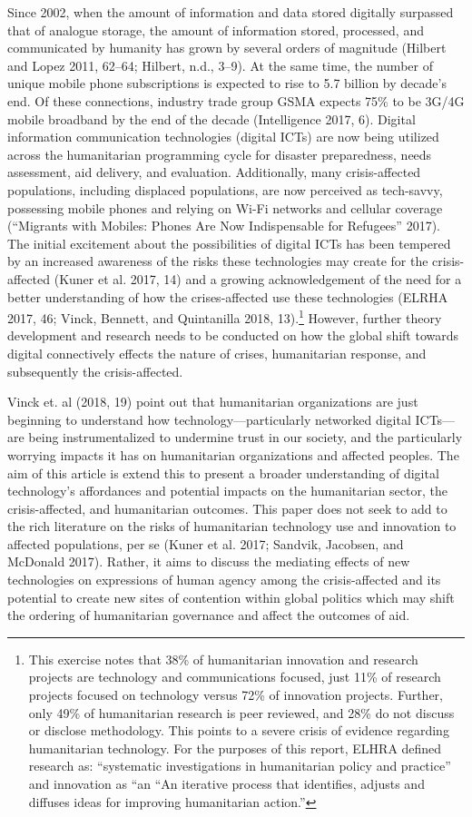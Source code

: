 \documentclass[
]{article}
\begin{document}
Since 2002, when the amount of information and data stored digitally
surpassed that of analogue storage, the amount of information stored,
processed, and communicated by humanity has grown by several orders of
magnitude (Hilbert and Lopez 2011, 62--64; Hilbert, n.d., 3--9). At the
same time, the number of unique mobile phone subscriptions is expected
to rise to 5.7 billion by decade's end. Of these connections, industry
trade group GSMA expects 75\% to be 3G/4G mobile broadband by the end of
the decade (Intelligence 2017, 6). Digital information communication
technologies (digital ICTs) are now being utilized across the
humanitarian programming cycle for disaster preparedness, needs
assessment, aid delivery, and evaluation. Additionally, many
crisis-affected populations, including displaced populations, are now
perceived as tech-savvy, possessing mobile phones and relying on Wi-Fi
networks and cellular coverage (``Migrants with Mobiles: Phones Are Now
Indispensable for Refugees'' 2017). The initial excitement about the
possibilities of digital ICTs has been tempered by an increased
awareness of the risks these technologies may create for the
crisis-affected (Kuner et al. 2017, 14) and a growing acknowledgement of
the need for a better understanding of how the crises-affected use these
technologies (ELRHA 2017, 46; Vinck, Bennett, and Quintanilla 2018,
13).\footnote{This exercise notes that 38\% of humanitarian innovation
  and research projects are technology and communications focused, just
  11\% of research projects focused on technology versus 72\% of
  innovation projects. Further, only 49\% of humanitarian research is
  peer reviewed, and 28\% do not discuss or disclose methodology. This
  points to a severe crisis of evidence regarding humanitarian
  technology. For the purposes of this report, ELHRA defined research
  as: ``systematic investigations in humanitarian policy and practice''
  and innovation as ``an ``An iterative process that identifies, adjusts
  and diffuses ideas for improving humanitarian action.''} However,
further theory development and research needs to be conducted on how the
global shift towards digital connectively effects the nature of crises,
humanitarian response, and subsequently the crisis-affected.

Vinck et. al (2018, 19) point out that humanitarian organizations are
just beginning to understand how technology---particularly networked
digital ICTs---are being instrumentalized to undermine trust in our
society, and the particularly worrying impacts it has on humanitarian
organizations and affected peoples. The aim of this article is extend
this to present a broader understanding of digital technology's
affordances and potential impacts on the humanitarian sector, the
crisis-affected, and humanitarian outcomes. This paper does not seek to
add to the rich literature on the risks of humanitarian technology use
and innovation to affected populations, per se (Kuner et al. 2017;
Sandvik, Jacobsen, and McDonald 2017). Rather, it aims to discuss the
mediating effects of new technologies on expressions of human agency
among the crisis-affected and its potential to create new sites of
contention within global politics which may shift the ordering of
humanitarian governance and affect the outcomes of aid.
\end{document}
